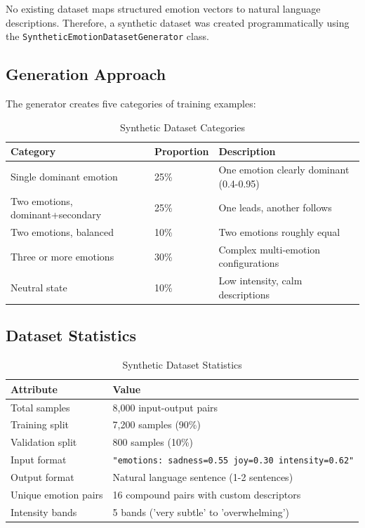 \documentclass[12pt, a4paper]{report}
\begin{document}
No existing dataset maps structured emotion vectors to natural language descriptions. Therefore, a synthetic dataset was created programmatically using the \texttt{SyntheticEmotionDatasetGenerator} class.

\subsection{Generation Approach}

The generator creates five categories of training examples:

\begin{table}[H]
    \centering
    \caption{Synthetic Dataset Categories}
    \label{tab:synthetic}
    \begin{tabular}{@{}lll@{}}
        \toprule
        \textbf{Category} & \textbf{Proportion} & \textbf{Description} \\
        \midrule
        Single dominant emotion & 25\% & One emotion clearly dominant (0.4-0.95) \\
        Two emotions, dominant+secondary & 25\% & One leads, another follows \\
        Two emotions, balanced & 10\% & Two emotions roughly equal \\
        Three or more emotions & 30\% & Complex multi-emotion configurations \\
        Neutral state & 10\% & Low intensity, calm descriptions \\
        \bottomrule
    \end{tabular}
\end{table}

\subsection{Dataset Statistics}

\begin{table}[H]
    \centering
    \caption{Synthetic Dataset Statistics}
    \label{tab:synthetic_stats}
    \begin{tabular}{@{}ll@{}}
        \toprule
        \textbf{Attribute} & \textbf{Value} \\
        \midrule
        Total samples & 8,000 input-output pairs \\
        Training split & 7,200 samples (90\%) \\
        Validation split & 800 samples (10\%) \\
        Input format & \texttt{"emotions: sadness=0.55 joy=0.30 intensity=0.62"} \\
        Output format & Natural language sentence (1-2 sentences) \\
        Unique emotion pairs & 16 compound pairs with custom descriptors \\
        Intensity bands & 5 bands ('very subtle' to 'overwhelming') \\
        \bottomrule
    \end{tabular}
\end{table}
\end{document}
